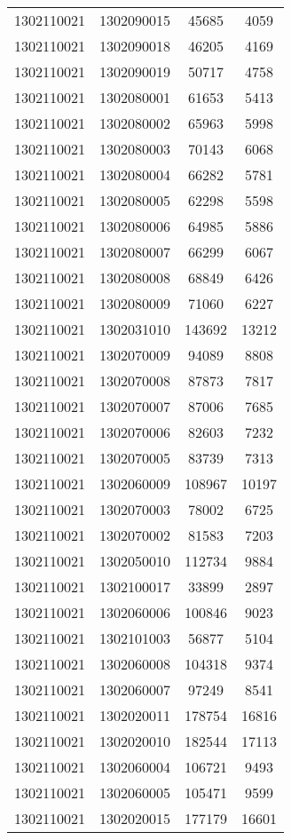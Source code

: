 \begin{longtable}{llcc}
1302110021 & 1302090015 & 45685 & 4059\\
1302110021 & 1302090018 & 46205 & 4169\\
1302110021 & 1302090019 & 50717 & 4758\\
1302110021 & 1302080001 & 61653 & 5413\\
1302110021 & 1302080002 & 65963 & 5998\\
1302110021 & 1302080003 & 70143 & 6068\\
1302110021 & 1302080004 & 66282 & 5781\\
1302110021 & 1302080005 & 62298 & 5598\\
1302110021 & 1302080006 & 64985 & 5886\\
1302110021 & 1302080007 & 66299 & 6067\\
1302110021 & 1302080008 & 68849 & 6426\\
1302110021 & 1302080009 & 71060 & 6227\\
1302110021 & 1302031010 & 143692 & 13212\\
1302110021 & 1302070009 & 94089 & 8808\\
1302110021 & 1302070008 & 87873 & 7817\\
1302110021 & 1302070007 & 87006 & 7685\\
1302110021 & 1302070006 & 82603 & 7232\\
1302110021 & 1302070005 & 83739 & 7313\\
1302110021 & 1302060009 & 108967 & 10197\\
1302110021 & 1302070003 & 78002 & 6725\\
1302110021 & 1302070002 & 81583 & 7203\\
1302110021 & 1302050010 & 112734 & 9884\\
1302110021 & 1302100017 & 33899 & 2897\\
1302110021 & 1302060006 & 100846 & 9023\\
1302110021 & 1302101003 & 56877 & 5104\\
1302110021 & 1302060008 & 104318 & 9374\\
1302110021 & 1302060007 & 97249 & 8541\\
1302110021 & 1302020011 & 178754 & 16816\\
1302110021 & 1302020010 & 182544 & 17113\\
1302110021 & 1302060004 & 106721 & 9493\\
1302110021 & 1302060005 & 105471 & 9599\\
1302110021 & 1302020015 & 177179 & 16601\\

\end{longtable}
